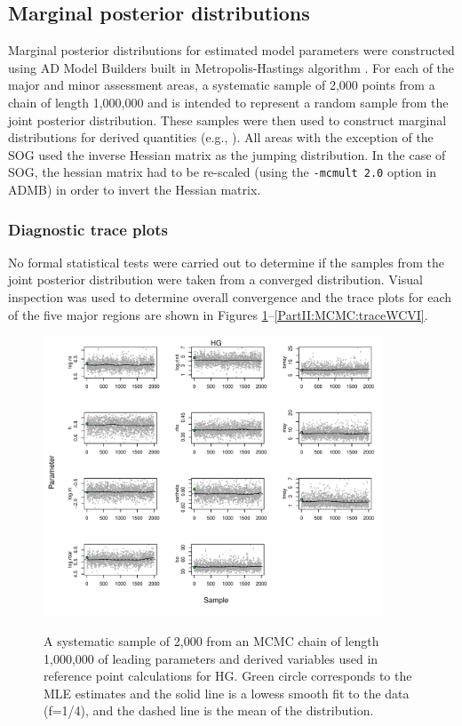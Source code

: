 \subsection{Marginal posterior distributions}
Marginal posterior distributions for estimated model parameters were constructed using AD Model Builders built in Metropolis-Hastings algorithm \citep{gelman2004bayesian}.  For each of the major and minor assessment areas, a systematic sample of 2,000 points from a chain of length 1,000,000 and is intended to represent a random sample from the joint posterior distribution.  These samples were then used to construct marginal distributions for derived quantities (e.g., \bo).  All areas with the exception of the SOG used the inverse Hessian matrix as the jumping distribution.  In the case of SOG, the hessian matrix had to be re-scaled (using the \texttt{-mcmult 2.0} option in ADMB) in order to invert the Hessian matrix.


\subsubsection{Diagnostic trace plots}

No formal  statistical tests were carried out to determine if the samples from the joint posterior distribution were taken from a converged distribution.  Visual inspection was used to determine overall convergence and the trace plots for each of the five major regions are shown in Figures \ref{PartII:MCMC:traceHG}--\ref{PartII:MCMC:traceWCVI}.

\begin{figure}
	\centering
	\includegraphics[width=0.9\textwidth]{../FIGS/qPriorFigs/iscam_fig_trace_HG.pdf}\\
	\caption{A systematic sample of 2,000 from an MCMC chain of length 1,000,000 of leading parameters and derived variables used in reference point calculations for HG. Green circle corresponds to the MLE estimates and the solid line is a lowess smooth fit to the data (f=1/4), and the dashed line is the mean of the distribution.}\label{PartII:MCMC:traceHG}
\end{figure}


